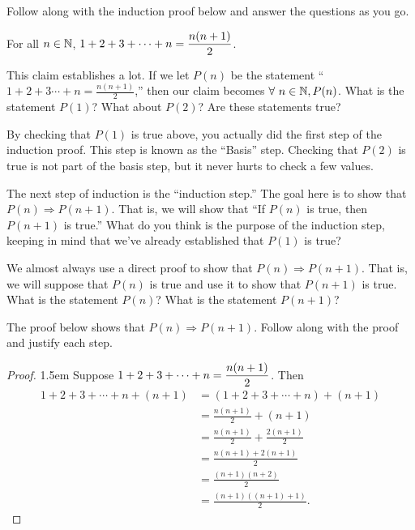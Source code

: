 \begin{question}
\item Follow along with the induction proof below and answer the questions as you go.

\begin{claim}
For all $n\in \mathbb{N}$, $\displaystyle 1+2+3+\cdots+n = \frac{n(n+1)}{2}$.
\end{claim}

\begin{qpart}
\item This claim establishes a lot.  If we let $P(n)$ be the statement ``$1+2+3\cdots +n = \frac{n(n+1)}{2}$,'' then our claim becomes $\forall \ n\in \mathbb{N}, P(n)$.  What is the statement $P(1)$?  What about $P(2)$?  Are these statements true?
\vspace{1in}
\item By checking that $P(1)$ is true above, you actually did the first step of the induction proof.  This step is known as the ``Basis'' step.  Checking that $P(2)$ is true is not part of the basis step, but it never hurts to check a few values.
\item The next step of induction is the ``induction step.''  The goal here is to show that $P(n) \Rightarrow P(n+1)$.  That is, we will show that ``If $P(n)$ is true, then $P(n+1)$ is true.''  What do you think is the purpose of the induction step, keeping in mind that we've already established that $P(1)$ is true?
\vspace{2in}
\item We almost always use a direct proof to show that $P(n) \Rightarrow P(n+1)$.  That is, we will suppose that $P(n)$ is true and use it to show that $P(n+1)$ is true.  What is the statement $P(n)$?  What is the statement $P(n+1)$?
\vspace{2in}
\item The proof below shows that $P(n) \Rightarrow P(n+1)$.  Follow along with the proof and justify each step.
\begin{proof}
\openup 1.5em Suppose $\displaystyle 1+2+3+\cdots+n= \frac{n(n+1)}{2}$.  Then 
\begin{align*}
1+2+3+\cdots + n + (n+1) &= (1+2+3+\cdots + n)+(n+1)\\
\ &= \frac{n(n+1)}{2} + (n+1) \\
\ &= \frac{n(n+1)}{2} + \frac{2(n+1)}{2}\\
\ &= \frac{n(n+1)+2(n+1)}{2}\\
\ &= \frac{(n+1)(n+2)}{2}\\
\ &= \frac{(n+1)((n+1)+1)}{2}.
\end{align*}

\end{proof}
\end{qpart}
\end{question}
